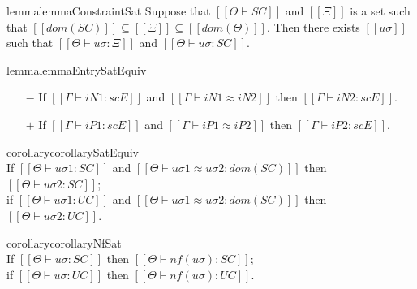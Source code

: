 \begin{restatable}{lemma}{lemmaConstraintSat}
    \label{lemma:constraint-sat}
    Suppose that $[[Θ ⊢ SC]]$
    and $[[Ξ]]$ is a set such that
    $[[dom(SC)]] \subseteq [[Ξ]] \subseteq [[dom(Θ)]]$.
    Then there exists 
    $[[uσ]]$ such that 
    $[[ Θ  ⊢ uσ : Ξ ]]$ and
    $[[ Θ  ⊢ uσ : SC ]]$.
\end{restatable}

\begin{restatable}{lemma}{lemmaEntrySatEquiv}
    \label{lemma:entry-sat-equiv}
    \hfill
    \begin{itemize}
        \item [$-$] If $[[Γ ⊢ iN1 : scE]]$ and $[[Γ ⊢ iN1 ≈ iN2]]$ then $[[Γ ⊢ iN2 : scE]]$.
        \item [$+$] If $[[Γ ⊢ iP1 : scE]]$ and $[[Γ ⊢ iP1 ≈ iP2]]$ then $[[Γ ⊢ iP2 : scE]]$.
    \end{itemize}
\end{restatable}

\begin{restatable}{corollary}{corollarySatEquiv}
    \label{corollary:sat-equiv}
    \hfill\\
    If $[[ Θ ⊢ uσ1 : SC ]]$ and $[[Θ ⊢ uσ1 ≈ uσ2 : dom(SC) ]]$ then $[[ Θ ⊢ uσ2 : SC ]]$;\\
    if $[[ Θ ⊢ uσ1 : UC ]]$ and $[[Θ ⊢ uσ1 ≈ uσ2 : dom(SC) ]]$ then $[[ Θ ⊢ uσ2 : UC ]]$.
\end{restatable}

\begin{restatable}{corollary}{corollaryNfSat}
    \label{corollary:nf-sat}
    \hfill\\
    If $[[Θ ⊢ uσ : SC]]$ then $[[Θ  ⊢ nf(uσ) : SC]]$;\\
    if $[[Θ ⊢ uσ : UC]]$ then $[[Θ  ⊢ nf(uσ) : UC]]$.
\end{restatable}
